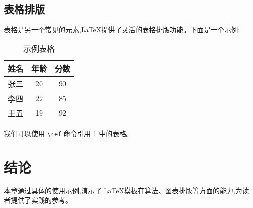 \subsection{表格排版}
表格是另一个常见的元素,\LaTeX 提供了灵活的表格排版功能。下面是一个示例:

\begin{table}[htbp]
    \centering
\caption{示例表格}
\label{tab:example_table}
\begin{tabular}{c|c|c}
\hline
姓名 & 年龄 & 分数 \\
\hline
张三 & 20 & 90 \\
李四 & 22 & 85 \\
王五 & 19 & 92 \\
\hline
\end{tabular}

\end{table}

我们可以使用 \verb|\ref| 命令引用 \ref{tab:example_table} 中的表格。

\section{结论}
本章通过具体的使用示例,演示了 \LaTeX 模板在算法、图表排版等方面的能力,为读者提供了实践的参考。